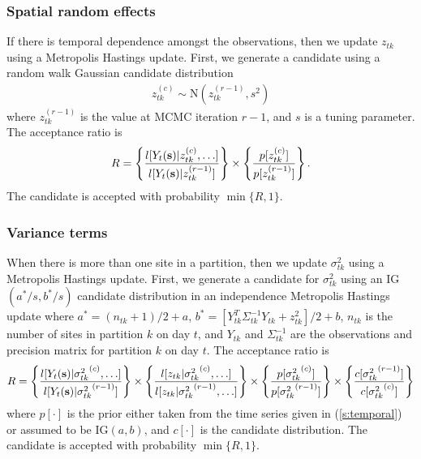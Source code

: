 \documentclass[11pt]{article}
\begin{document}
\subsubsection*{Spatial random effects}
If there is temporal dependence amongst the observations, then we update $z_{tk}$ using a Metropolis Hastings update.
First, we generate a candidate using a random walk Gaussian candidate distribution
\begin{align*}
  z_{tk}^{(c)} \sim \text{N}(z_{tk}^{(r - 1)}, s^2)
\end{align*}
where $z_{tk}^{(r-1)}$ is the value at MCMC iteration $r - 1$, and $s$ is a tuning parameter.
The acceptance ratio is
\begin{align*}
  R = \left\{ \frac{ l[Y_t(\mbox{\bf s}) | z_{tk}^{(c)}, \ldots] }{ l[Y_t(\mbox{\bf s}) | z_{tk}^{(r - 1)}]} \right\} \times \left\{ \frac{ p[ z_{tk}^{(c)} ] }{ p[ z_{tk}^{(r - 1)}]}\right\}.
\end{align*}
The candidate is accepted with probability $\min\{R, 1\}$.

\subsubsection*{Variance terms}
When there is more than one site in a partition, then we update $\sigma^2_{tk}$ using a Metropolis Hastings update.
First, we generate a candidate for $\sigma^2_{tk}$ using an IG$(a^*/s, b^*/s)$ candidate distribution in an independence Metropolis Hastings update where $a^* = (n_{tk} + 1) / 2 + a$, $b^* = [Y_{tk}^T \Sigma^{-1}_{tk} Y_{tk} + z_{tk}^2] / 2 + b$, $n_{tk}$ is the number of sites in partition $k$ on day $t$, and $Y_{tk}$ and $\Sigma^{-1}_{tk}$ are the observations and precision matrix for partition $k$ on day $t$.
The acceptance ratio is
\begin{align*}
  R = \left\{
    \frac{ l[Y_t(\mbox{\bf s}) | {\sigma^2_{tk}}^{(c)}, \ldots] }
         { l[Y_t(\mbox{\bf s}) | {\sigma^2_{tk}}^{(r - 1)}]}
    \right\} \times \left\{
    \frac{ l[z_{tk} | {\sigma^2_{tk}}^{(c)}, \ldots] }
         { l[z_{tk} | {\sigma^2_{tk}}^{(r - 1)}, \ldots] }
    \right\} \times \left\{
    \frac{ p[ {\sigma^2_{tk}}^{(c)} ] }
         { p[ {\sigma^2_{tk}}^{(r - 1)}] }
    \right\} \times \left\{
    \frac{ c[ {\sigma^2_{tk}}^{(r - 1)}] }
         { c[ {\sigma^2_{tk}}^{(c)}]}
    \right\}
\end{align*}
where $p[\cdot]$ is the prior either taken from the time series given in (\ref{s:temporal}) or assumed to be IG$(a, b)$, and $c[\cdot]$ is the candidate distribution.
The candidate is accepted with probability $\min\{R, 1\}$.
\end{document}
